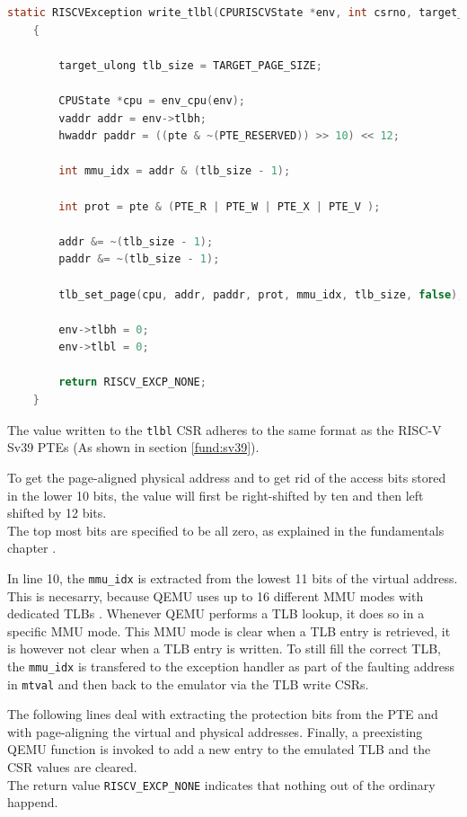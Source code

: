 \begin{lstlisting}[language=c,float=h!,
    label={lst:tlbl}]
    static RISCVException write_tlbl(CPURISCVState *env, int csrno, target_ulong pte)
    {
        
        target_ulong tlb_size = TARGET_PAGE_SIZE;
        
        CPUState *cpu = env_cpu(env);
        vaddr addr = env->tlbh;
        hwaddr paddr = ((pte & ~(PTE_RESERVED)) >> 10) << 12;

        int mmu_idx = addr & (tlb_size - 1);

        int prot = pte & (PTE_R | PTE_W | PTE_X | PTE_V );

        addr &= ~(tlb_size - 1);
        paddr &= ~(tlb_size - 1);

        tlb_set_page(cpu, addr, paddr, prot, mmu_idx, tlb_size, false);
        
        env->tlbh = 0;
        env->tlbl = 0;

        return RISCV_EXCP_NONE;
    }
\end{lstlisting}
The value written to the \texttt{tlbl} CSR adheres to the same format as the RISC-V Sv39 PTEs (As shown in section \ref{fund:sv39}).

To get the page-aligned physical address and to get rid of the access bits stored in the lower 10 bits,
the value will first be right-shifted by ten and then left shifted by 12 bits.\\
The top most bits are specified to be all zero, as explained in the fundamentals chapter \cite{RISCVInstructionSet}.

In line 10, the \texttt{mmu\_idx} is extracted from the lowest 11 bits of the virtual address. This is
necesarry, because QEMU uses up to 16 different MMU modes with dedicated TLBs \cite{QEMUSource2024}.
Whenever QEMU performs a TLB lookup, it does so in a specific MMU mode. This MMU mode is clear when
a TLB entry is retrieved, it is however not clear when a TLB entry is written.
To still fill the correct TLB, the \texttt{mmu\_idx} is transfered to the exception handler as part
of the faulting address in \texttt{mtval} and then back to the emulator via the TLB write CSRs.

The following lines deal with extracting the protection bits from the PTE and with page-aligning
the virtual and physical addresses. Finally, a preexisting QEMU function is invoked to add
a new entry to the emulated TLB and the CSR values are cleared.\\
The return value \texttt{RISCV\_EXCP\_NONE} indicates that nothing out of the ordinary happend.

